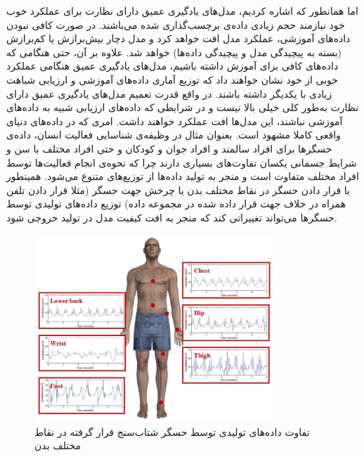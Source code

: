 اما همانطور که اشاره کردیم، مدل‌های یادگیری عمیق
دارای نظارت
برای عملکرد خوب خود نیازمند حجم زیادی داده‌ی برچسب‌گذاری شده می‌باشند. در صورت کافی نبودن داده‌های آموزشی، عملکرد مدل افت خواهد کرد و مدل دچار
بیش‌برازش
یا کم‌برازش
(بسته به پیچیدگی مدل و پیچیدگی داده‌ها)
خواهد شد. علاوه بر آن، حتی هنگامی که داده‌های کافی برای آموزش داشته باشیم، مدل‌های یادگیری عمیق هنگامی عملکرد خوبی از خود نشان خواهند داد که توزیع آماری داده‌های آموزشی و ارزیابی شباهت زیادی با یکدیگر داشته باشند. در واقع
قدرت تعمیم
مدل‌های یادگیری عمیق دارای نظارت به‌طور کلی خیلی بالا نیست و در شرایطی که داده‌های ارزیابی شبیه به داده‌های آموزشی نباشند، این مدل‌ها افت عملکرد خواهند داشت\cite{recht2019imagenet}.
امری که در داده‌های دنیای واقعی کاملا مشهود است. بعنوان مثال در وظیفه‌ی شناسایی فعالیت انسان، داده‌ی حسگرها برای افراد سالمند و افراد جوان و کودکان و حتی افراد مختلف با سن و شرایط جسمانی یکسان تفاوت‌های بسیاری دارند چرا که نحوه‌ی انجام فعالیت‌ها توسط افراد مختلف متفاوت است و منجر به تولید داده‌ها از توزیع‌های متنوع می‌شود. همینطور با قرار دادن حسگر در نقاط مختلف بدن یا چرخش جهت حسگر (مثلا قرار دادن تلفن همراه در خلاف جهت قرار داده شده در مجموعه داده) توزیع داده‌های تولیدی توسط حسگرها می‌تواند تغییراتی کند که منجر به افت کیفیت مدل در تولید خروجی شود\cite{cleland2013optimal}.
\begin{figure}[htbp]
  \centering
  \includegraphics[width=0.8\textwidth]{Images/Chapter1/accelerometer-placement.png}
  \caption{تفاوت داده‌های تولیدی توسط حسگر شتاب‌سنج قرار گرفته در نقاط مختلف بدن}
  \label{fig:accelerometer-placement}
\end{figure}

